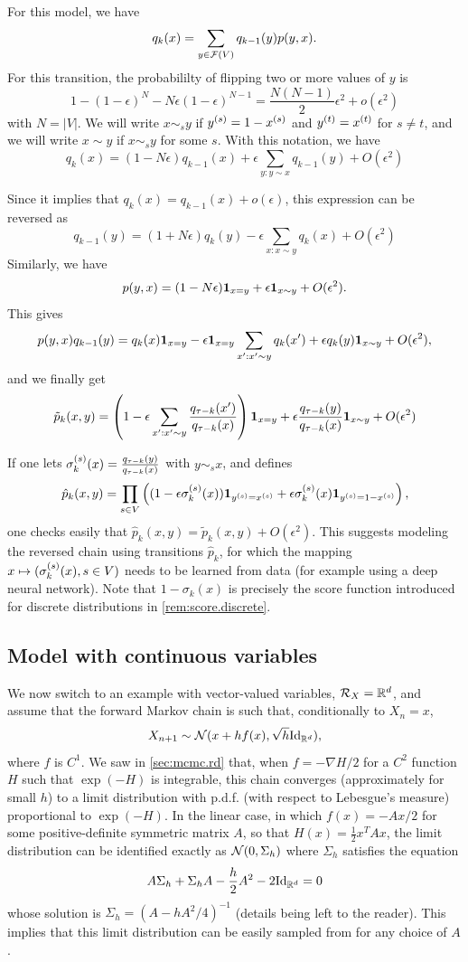 For this model, we have 
\[
q_k(x) = \sum_{y\in {\mathcal F}(V)} q_{k-1}(y) p(y,x).
\]
For this transition, the probabililty of flipping two or more values of $y$ is 
\[
1 - (1-\epsilon)^N - N\epsilon (1-\epsilon)^{N-1}  = \frac{N(N-1)}2 \epsilon^2 + o(\epsilon^2)
\]
with $N = |V|$. We will write $x\sim_s y$ if $y^{(s)} = 1 - x^{(s)}$ and $y^{(t)} = x^{(t)}$ for $s\neq t$, and we will write $x\sim y$ if $x\sim_s y$ for some $s$.
With this notation, we have 
\[
q_k(x) = (1-N\epsilon) q_{k-1}(x) + \epsilon \sum_{y: y\sim x} q_{k-1}(y) + O(\epsilon^2)
\]

Since it implies that $q_k(x) = q_{k-1}(x) + o(\epsilon)$, this expression can be reversed as
\[
q_{k-1}(y) = (1+N\epsilon) q_{k}(y) - \epsilon \sum_{x: x\sim y} q_{k}(x) + O(\epsilon^2)
\]
Similarly, we have
\[
p(y,x) = (1-N\epsilon) {\bm 1}_{x=y} + \epsilon {\bm1}_{x \sim y } + O(\epsilon^2).
\]
This gives
\[
p(y,x)q_{k-1}(y) =  q_{k}(x) {\bm 1}_{x=y} - \epsilon {\bm1}_{x=y}  \sum_{x': x'\sim y} q_{k}(x' ) + \epsilon
q_k(y) {\bm 1}_{x\sim y } + O(\epsilon^2),
\]
and we finally get
\[
\tilde p_k(x,y) = \left(1 - \epsilon   \sum_{x': x'\sim y} \frac{ q_{\tau-k}(x' )}{q_{\tau-k}(x)}\right) {\bm 1}_{x=y} + \epsilon
\frac{q_{\tau-k}(y)}{q_{\tau-k}(x)} {\bm 1}_{x\sim y } + O(\epsilon^2)
\]

If one lets $\sigma_k^{(s)}(x) = \frac{q_{\tau-k}(y)}{q_{\tau-k}(x)}$ with $y\sim_s x$, and defines
\[
\hat p_k(x,y) = \prod_{s\in V} \left((1-\epsilon \sigma_k^{(s)}(x)) {\bm 1}_{y^{(s)} = x^{(s)}} + \epsilon \sigma_k^{(s)}(x){\bm 1}_{y^{(s)} = 1 - x^{(s)}}\right),
\]
one checks easily that $\hat p_k(x,y) = \tilde p_k(x,y) + O(\epsilon^2)$. This suggests modeling the reversed chain using transitions $\hat p_k$, for which the mapping $x\mapsto (\sigma_k^{(s)}(x), s\in V)$ needs to be learned from data (for example using a deep neural network).  Note that $1 - \sigma_k(x)$ is precisely the score function introduced for discrete distributions in \cref{rem:score.discrete}. 

\subsection{Model with continuous variables}
We now switch to an example with vector-valued variables, ${\mathcal R}_X = {\mathbb{R}}^d$, and assume that the forward Markov chain is such that, conditionally to $X_n=x$,  
\[
X_{n+1} \sim \CN(x + h f(x), \sqrt h\Id[d]),
\]
 where $f$ is $C^1$. We saw in \cref{sec:mcmc.rd} that, when $f = -\nabla H/2$ for a $C^2$ function $H$ such that $\exp(-H)$ is integrable, this chain converges (approximately for small $h$) to a limit distribution with p.d.f. (with respect to Lebesgue's measure) proportional to $\exp(-H)$.  In the linear case, in which $f(x) = -Ax/2$ for some positive-definite symmetric matrix $A$, so that $H(x) = \frac12 x^TAx$, the limit distribution can be identified exactly as ${\mathcal N}(0, \Sigma_h)$ where $\Sigma_h$ satisfies the equation
\[
A\Sigma_h + \Sigma_h A - \frac{h}{2} A^2 - 2\Id[d] = 0
\]  
whose solution is $\Sigma_h = (A - hA^2/4)^{-1}$
(details being left to the reader). This implies that this limit distribution can be easily sampled from for any choice of $A$. 

